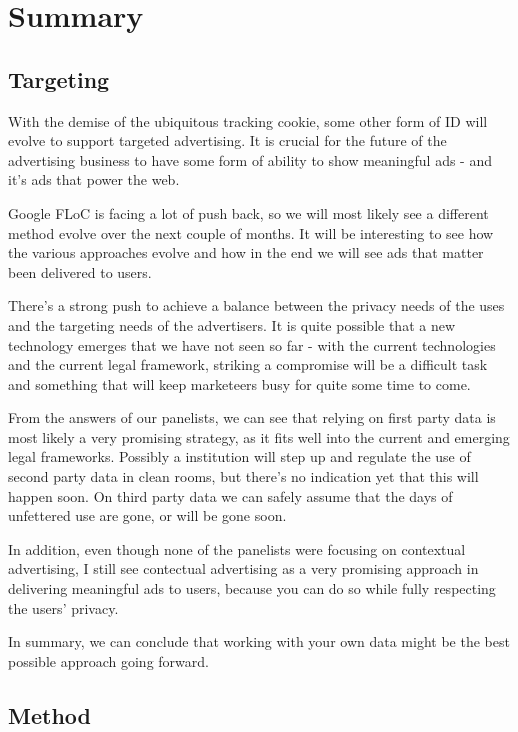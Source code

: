%
%

\pagebreak
\section{Summary}

\onehalfspacing

\subsection{Targeting}

With the demise of the ubiquitous tracking cookie, some other form of ID will evolve to support targeted advertising. It is crucial for the future of the advertising business to have some form of ability to show meaningful ads - and it's ads that power the web.

Google FLoC is facing a lot of push back, so we will most likely see a different method evolve over the next couple of months. It will be interesting to see how the various approaches evolve and how in the end we will see ads that matter been delivered to users.

There's a strong push to achieve a balance between the privacy needs of the uses and the targeting needs of the advertisers. It is quite possible that a new technology emerges that we have not seen so far - with the current technologies and the current legal framework, striking a compromise will be a difficult task and something that will keep marketeers busy for quite some time to come.

From the answers of our panelists, we can see that relying on first party data is most likely a very promising strategy, as it fits well into the current and emerging legal frameworks. Possibly a institution will step up and regulate the use of second party data in clean rooms, but there's no indication yet that this will happen soon. On third party data we can safely assume that the days of unfettered use are gone, or will be gone soon. 

In addition, even though none of the panelists were focusing on contextual advertising, I still see contectual advertising as a very promising approach in delivering meaningful ads to users, because you can do so while fully respecting the users' privacy.

In summary, we can conclude that working with your own data might be the best possible approach going forward.

\subsection{Method}

